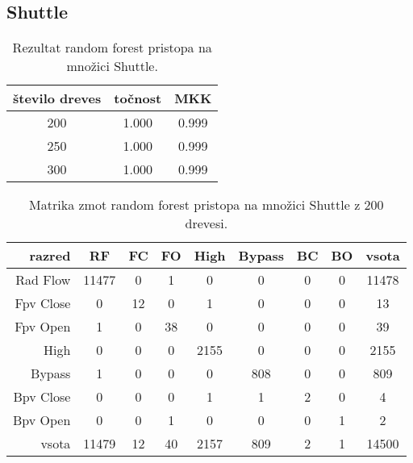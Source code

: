 \subsection{Shuttle}\label{subsec:random-forest-shuttle-test}
\begin{table}[H]
    \begin{center}
        \begin{tabular}{|| c | c c ||}
            \hline
            število dreves & točnost & MKK   \\
            \hline
            200            & 1.000   & 0.999 \\
            \hline
            250            & 1.000   & 0.999 \\
            \hline
            300            & 1.000   & 0.999 \\
            \hline
        \end{tabular}
    \end{center}
    \caption{Rezultat random forest pristopa na množici Shuttle.}
    \label{tab:rforest_shuttle_result}
\end{table}

\begin{table}[H]
    \centering
    \begin{tabular}{||rcccccccc||}
        \hline
        razred    & RF    & FC & FO & High & Bypass & BC & BO & vsota \\ \hline
        Rad Flow  & 11477 & 0  & 1  & 0    & 0      & 0  & 0  & 11478 \\ \hline
        Fpv Close & 0     & 12 & 0  & 1    & 0      & 0  & 0  & 13    \\ \hline
        Fpv Open  & 1     & 0  & 38 & 0    & 0      & 0  & 0  & 39    \\ \hline
        High      & 0     & 0  & 0  & 2155 & 0      & 0  & 0  & 2155  \\ \hline
        Bypass    & 1     & 0  & 0  & 0    & 808    & 0  & 0  & 809   \\ \hline
        Bpv Close & 0     & 0  & 0  & 1    & 1      & 2  & 0  & 4     \\ \hline
        Bpv Open  & 0     & 0  & 1  & 0    & 0      & 0  & 1  & 2     \\ \hline
        vsota     & 11479 & 12 & 40 & 2157 & 809    & 2  & 1  & 14500 \\ \hline
    \end{tabular}
    \caption{Matrika zmot random forest pristopa na množici Shuttle z 200 drevesi.}
    \label{tab:rforest_shuttle_cm_1}
\end{table}

